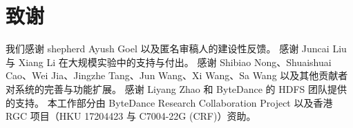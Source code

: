 \section{致谢}\label{sec:ack}
我们感谢 shepherd Ayush Goel 以及匿名审稿人的建设性反馈。
感谢 Juncai Liu 与 Xiang Li 在大规模实验中的支持与付出。
感谢 Shibiao Nong、Shuaishuai Cao、Wei Jia、Jingzhe Tang、Jun Wang、Xi Wang、Sa Wang 以及其他贡献者对系统的完善与功能扩展。
感谢 Liyang Zhao 和 ByteDance 的 HDFS 团队提供的支持。
本工作部分由 ByteDance Research Collaboration Project 以及香港 RGC 项目（HKU 17204423 与 C7004-22G (CRF)）资助。
